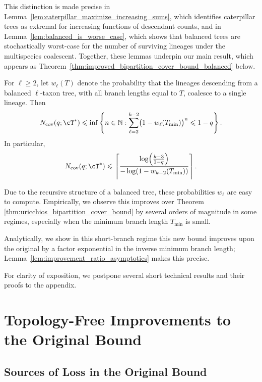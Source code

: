 This distinction is made precise in Lemma~\ref{lem:caterpillar_maximize_increasing_sums}, which identifies caterpillar trees as extremal for increasing functions of descendant counts, and in Lemma~\ref{lem:balanced_is_worse_case}, which shows that balanced trees are stochastically worst-case for the number of surviving lineages under the multispecies coalescent. Together, these lemmas underpin our main result, which appears as Theorem~\ref{thm:improved_bipartition_cover_bound_balanced} below.

\begin{theorem*}
For $\ell\geq 2$, let $w_\ell(T)$ denote the probability that the lineages descending
from a balanced $\ell$-taxon tree, with all branch lengths equal to $T$, coalesce to a single
lineage. Then
\[
N_{\mathrm{cov}}(q;\cT^*)\leq
\inf\left\{n\in\N:
    \sum_{\ell=2}^{k-2}\bigl(1-w_\ell(T_{\min})\bigr)^n\leq 1-q
\right\}.
\]
In particular,
\[
N_{\mathrm{cov}}(q;\cT^*)\leq \left\lceil
    \frac{\log\!\left(\frac{k-3}{1-q}\right)}
         {-\log\!\left(1-w_{k-2}(T_{\min})\right)}
\right\rceil.
\]
\end{theorem*}

\noindent Due to the recursive structure of a balanced tree, these probabilities $w_\ell$ are easy
to compute. Empirically, we observe this improves over Theorem \ref{thm:uricchios_bipartition_cover_bound} by
several orders of magnitude in some regimes, especially when the minimum branch length $T_{\mathrm{min}}$ is small.

Analytically, we show in this short-branch regime this new bound improves upon the original
by a factor exponential in the inverse minimum branch length; Lemma~\ref{lem:improvement_ratio_asymptotics} makes
this precise.

For clarity of exposition, we postpone several short technical results and their proofs to the appendix.


\section{Topology-Free Improvements to the Original Bound}
\label{sec:topology-free-improvements}

\subsection{Sources of Loss in the Original Bound}
\label{sec:sources-of-loss}

